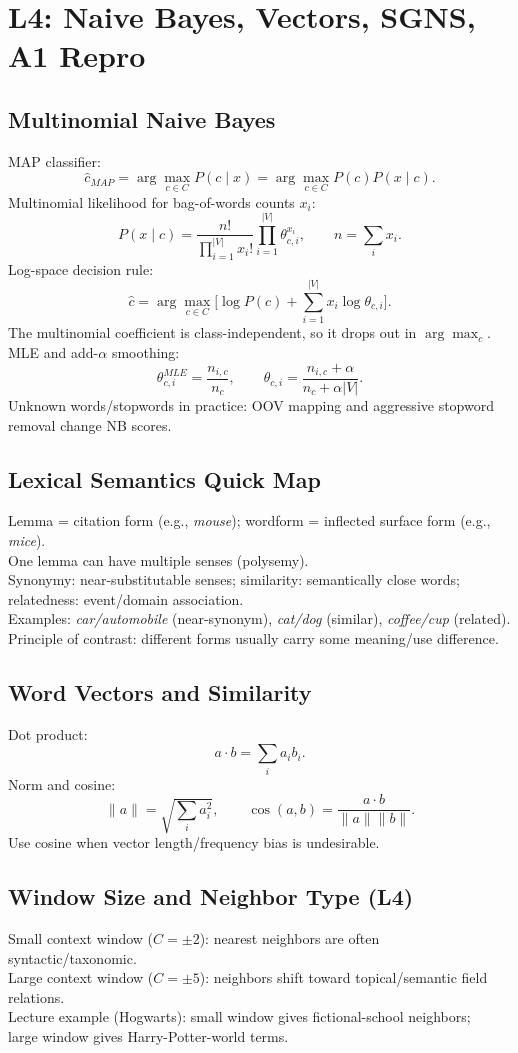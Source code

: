 \section{L4: Naive Bayes, Vectors, SGNS, A1 Repro}
\subsection*{Multinomial Naive Bayes}
MAP classifier:
\[
\hat c_{MAP}=\arg\max_{c\in C}P(c\mid x)
=\arg\max_{c\in C}P(c)P(x\mid c).
\]
Multinomial likelihood for bag-of-words counts $x_i$:
\[
P(x\mid c)=\frac{n!}{\prod_{i=1}^{|V|}x_i!}
\prod_{i=1}^{|V|}\theta_{c,i}^{x_i},
\qquad
n=\sum_i x_i.
\]
Log-space decision rule:
\[
\hat c=\arg\max_{c\in C}\Big[
\log P(c)+\sum_{i=1}^{|V|}x_i\log\theta_{c,i}
\Big].
\]
The multinomial coefficient is class-independent, so it drops out in $\arg\max_c$.\\
MLE and add-$\alpha$ smoothing:
\[
\theta_{c,i}^{MLE}=\frac{n_{i,c}}{n_c},
\qquad
\theta_{c,i}=\frac{n_{i,c}+\alpha}{n_c+\alpha|V|}.
\]
Unknown words/stopwords in practice: OOV mapping and aggressive stopword removal change NB scores.

\subsection*{Lexical Semantics Quick Map}
Lemma = citation form (e.g., \textit{mouse}); wordform = inflected surface form (e.g., \textit{mice}).\\
One lemma can have multiple senses (polysemy).\\
Synonymy: near-substitutable senses; similarity: semantically close words;\\
relatedness: event/domain association.\\
Examples: \textit{car/automobile} (near-synonym), \textit{cat/dog} (similar), \textit{coffee/cup} (related).\\
Principle of contrast: different forms usually carry some meaning/use difference.

\subsection*{Word Vectors and Similarity}
Dot product:
\[
a\cdot b=\sum_i a_i b_i.
\]
Norm and cosine:
\[
\|a\|=\sqrt{\sum_i a_i^2},
\qquad
\cos(a,b)=\frac{a\cdot b}{\|a\|\|b\|}.
\]
Use cosine when vector length/frequency bias is undesirable.

\subsection*{Window Size and Neighbor Type (L4)}
Small context window ($C=\pm2$): nearest neighbors are often syntactic/taxonomic.\\
Large context window ($C=\pm5$): neighbors shift toward topical/semantic field relations.\\
Lecture example (Hogwarts): small window gives fictional-school neighbors;\\
large window gives Harry-Potter-world terms.

